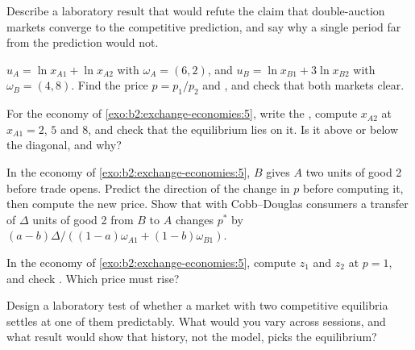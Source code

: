 \begin{exercise}[$\star$]\label{exo:b2:exchange-economies:4}
Describe a laboratory result that would refute the claim that double-auction markets converge to the
competitive prediction, and say why a single period far from the prediction would not.
\end{exercise}

\begin{exercise}[$\star\star$]\label{exo:b2:exchange-economies:5}
$u_A = \ln x_{A1} + \ln x_{A2}$ with $\omega_A = (6, 2)$, and $u_B = \ln x_{B1} + 3\ln x_{B2}$ with
$\omega_B = (4, 8)$. Find the  price $p = p_1/p_2$ and , and check that
both markets clear.
\end{exercise}

\begin{exercise}[$\star\star$]\label{exo:b2:exchange-economies:6}
For the economy of \cref{exo:b2:exchange-economies:5}, write the , compute $x_{A2}$ at
$x_{A1} = 2$, $5$ and $8$, and check that the equilibrium  lies on it. Is it above or below the
diagonal, and why?
\end{exercise}

\begin{exercise}[$\star\star$]\label{exo:b2:exchange-economies:7}
In the economy of \cref{exo:b2:exchange-economies:5}, $B$ gives $A$ two units of good 2 before trade
opens. Predict the direction of the change in $p$ before computing it, then compute the new price. Show
that with Cobb--Douglas consumers a transfer of $\Delta$ units of good 2 from $B$ to $A$ changes $p^*$ by
$(a - b)\Delta/((1 - a)\omega_{A1} + (1 - b)\omega_{B1})$.
\end{exercise}

\begin{exercise}[$\star\star$]\label{exo:b2:exchange-economies:8}
In the economy of \cref{exo:b2:exchange-economies:5}, compute $z_1$ and $z_2$ at $p = 1$, and check
. Which price must rise?
\end{exercise}

\begin{exercise}[$\star\star$]\label{exo:b2:exchange-economies:9}
Design a laboratory test of whether a market with two competitive equilibria settles at one of them
predictably. What would you vary across sessions, and what result would show that history, not the
model, picks the equilibrium?
\end{exercise}

